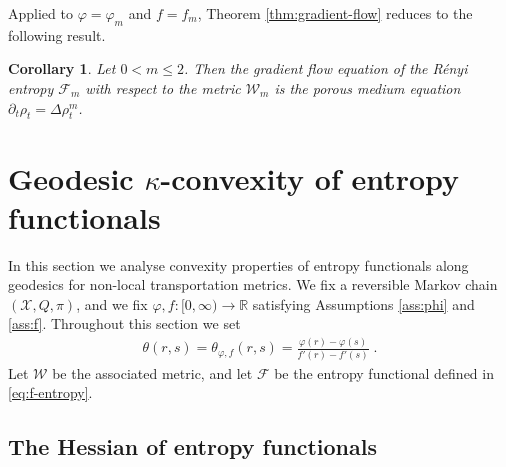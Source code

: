 \documentclass[a4paper,11pt,reqno]{amsart}
\theoremstyle{plain}
\newtheorem{corollary}[theorem]{Corollary}
\theoremstyle{remark}
\numberwithin{equation}{section}
\begin{document}
Applied to ${\varphi} = {\varphi}_m$ and $f = f_m$,
Theorem \ref{thm:gradient-flow} reduces to the following result.

\begin{corollary}\label{thm:gradient-flow-potenz}
  Let $0 < m \leq 2$. Then the gradient flow equation of the R\'enyi
  entropy ${\mathcal{F}}_m$ with respect to the metric ${\mathcal{W}}_m$ is the porous
  medium equation $\partial_t \rho_t = \Delta \rho_t^m$.
\end{corollary}

\section{Geodesic \texorpdfstring{$\kappa$}{k}-convexity of entropy
  functionals}\label{sec:convexity}

In this section we analyse convexity properties of entropy functionals
along geodesics for non-local transportation metrics. We fix a
reversible Markov chain $({\mathcal{X}}, Q, \pi)$, and we fix ${\varphi}, f :
[0,\infty) \to {{\mathbb R}}$ satisfying Assumptions \ref{ass:phi} and
\ref{ass:f}. Throughout this section we set
\begin{align}\label{eq:theta-phi-f}
 \theta(r,s) = \theta_{{\varphi}, f}(r,s) = \frac{{\varphi}(r) - {\varphi}(s)}{f'(r) - f'(s)}\;.
\end{align}
Let ${\mathcal{W}}$ be the associated metric, and let ${\mathcal{F}}$ be the entropy
functional defined in \eqref{eq:f-entropy}.

\subsection{The Hessian of entropy functionals}
\end{document}
